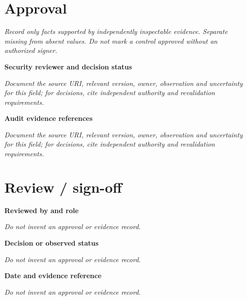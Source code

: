 \documentclass[11pt,letterpaper]{article}
\begin{document}
\section{Approval}
\noindent\emph{Record only facts supported by independently inspectable evidence. Separate missing from absent values. Do not mark a control approved without an authorized signer.}\par
\noindent\textbf{Security reviewer and decision status}\par
\noindent\emph{Document the source URI, relevant version, owner, observation and uncertainty for this field; for decisions, cite independent authority and revalidation requirements.}\par\medskip
\noindent\textbf{Audit evidence references}\par
\noindent\emph{Document the source URI, relevant version, owner, observation and uncertainty for this field; for decisions, cite independent authority and revalidation requirements.}\par\medskip
\section{Review / sign-off}
\noindent\textbf{Reviewed by and role}\par
\emph{Do not invent an approval or evidence record.}\par\medskip
\noindent\textbf{Decision or observed status}\par
\emph{Do not invent an approval or evidence record.}\par\medskip
\noindent\textbf{Date and evidence reference}\par
\emph{Do not invent an approval or evidence record.}\par\medskip
\end{document}
